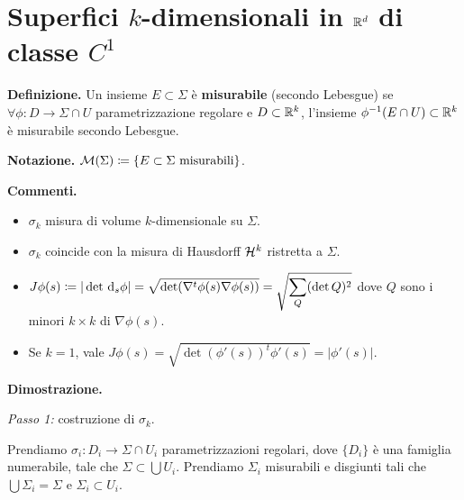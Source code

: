 \section{Superfici $k$-dimensionali in $\mathbb R^d$ di classe $C^1$}

\textbf{Definizione.} Un insieme $E \subset \Sigma$ è \textbf{misurabile} (secondo Lebesgue) se $\forall \phi \colon D \to \Sigma \cap U$ parametrizzazione regolare e $D \subset \mathbb R^k$, l'insieme $\phi^{-1}(E \cap U) \subset \mathbb R^k$ è misurabile secondo Lebesgue.

\textbf{Notazione.} $\mathcal{M}(\Sigma) \coloneqq  \{ E \subset \Sigma \text{ misurabili} \}$.


\textbf{Commenti.} 
\begin{itemize}

	\item $\sigma_k$ misura di volume $k$-dimensionale su $\Sigma$.

	\item $\sigma_k$ coincide con la misura di Hausdorff $\mathcal{H}^k$ ristretta a $\Sigma$.

	\item $\displaystyle J\phi (s) \coloneqq |\det \,\mathrm{d}_s \phi| = \sqrt{\det (\nabla^t \phi(s) \nabla \phi(s))} = \sqrt{\sum_Q (\det Q)^2} $ dove $Q$ sono i minori $k \times k$ di $\nabla \phi(s)$.

	\item Se $k = 1$, vale $J\phi(s) = \sqrt{\det(\phi'(s))^t \phi'(s)} = |\phi'(s)| $.

\end{itemize}


\textbf{Dimostrazione.} 

\textit{Passo 1:} costruzione di $\sigma_k$.

Prendiamo $\sigma_i \colon  D_i \to \Sigma \cap U_i$ parametrizzazioni regolari, dove $\{D_i\}$ è una famiglia numerabile, tale che $\Sigma \subset \bigcup U_i$.
Prendiamo $\Sigma_i$ misurabili e disgiunti tali che $\bigcup \Sigma_i = \Sigma$ e $\Sigma_i \subset U_i$.

